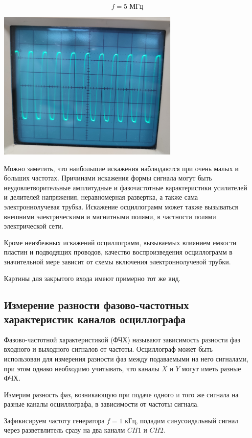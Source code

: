 \documentclass[a4paper, 12pt]{article} %
\begin{document}
\[f = 5 \text{ МГц}\]
\begin{center}
	\includegraphics[width=9cm]{8}
\end{center}

Можно заметить, что наибольшие искажения наблюдаются при очень малых и больших частотах. 
Причинами искажения формы сигнала могут быть неудовлетворительные амплитудные и фазочастотные карактеристики усилителей и делителей напряжения, неравномерная развертка, а также сама электроннолучевая трубка. Искажение осциллограмм может также вызываться внешними электрическими и магнитными полями, в частности полями электрической сети. 

Кроме неизбежных искажений осциллограмм, вызываемых влиянием емкости пластин и подводящих проводов, качество воспроизведения осциллограмм в значительной мере зависит от схемы включения электроннолучевой трубки.

Картины для закрытого входа имеют примерно тот же вид.

\subsection{Измерение разности фазово-частотных характеристик
каналов осциллографа}

Фазово-частотной характеристикой
(ФЧХ) называют зависимость разности фаз входного и выходного
сигналов от частоты. Осциллограф может быть использован для
измерения разности фаз между подаваемыми на него сигналами, при
этом однако необходимо учитывать, что каналы $X$ и $Y$ могут иметь
разные ФЧХ.

Измерим разность фаз, возникающую при подаче одного и того же сигнала на разные каналы осциллографа, в зависимости от частоты сигнала.

Зафикисируем частоту генератора $f = 1$ кГц, подадим синусоидальный сигнал через разветвлитель сразу на два каналм $CH1$ и $CH2$.
\end{document}
